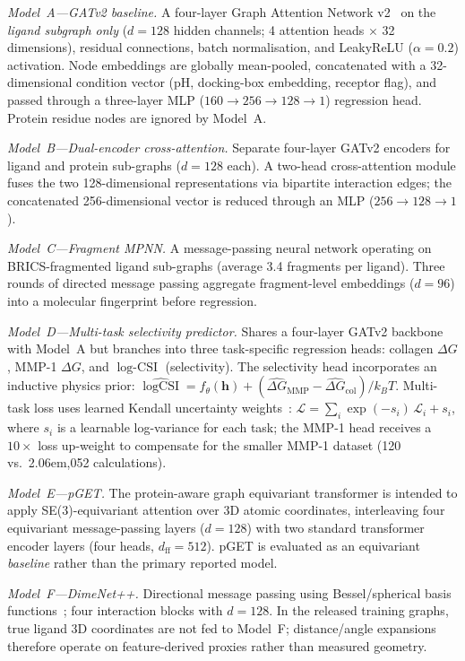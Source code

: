 \documentclass[11pt]{article}
\begin{document}
\emph{Model~A---GATv2 baseline.}
A four-layer Graph Attention Network v2~\cite{gilmer2017mpnn} on the
\emph{ligand subgraph only} ($d = 128$ hidden channels; 4 attention heads
$\times$ 32 dimensions), residual connections, batch normalisation, and
LeakyReLU ($\alpha = 0.2$) activation.  Node embeddings are globally
mean-pooled, concatenated with a 32-dimensional condition vector (pH,
docking-box embedding, receptor flag), and passed through a three-layer MLP
($160 \to 256 \to 128 \to 1$) regression head.
Protein residue nodes are ignored by Model~A.

\emph{Model~B---Dual-encoder cross-attention.}
Separate four-layer GATv2 encoders for ligand and protein sub-graphs
($d = 128$ each).  A two-head cross-attention module fuses the
two 128-dimensional representations via bipartite interaction edges;
the concatenated 256-dimensional vector is reduced through an MLP
($256 \to 128 \to 1$).

\emph{Model~C---Fragment MPNN.}
A message-passing neural network operating on BRICS-fragmented ligand
sub-graphs (average 3.4 fragments per ligand).  Three rounds of directed
message passing aggregate fragment-level embeddings ($d = 96$) into a
molecular fingerprint before regression.

\emph{Model~D---Multi-task selectivity predictor.}
Shares a four-layer GATv2 backbone with Model~A but branches into three
task-specific regression heads: collagen $\Delta G$, MMP-1 $\Delta G$,
and $\log\text{-CSI}$ (selectivity).  The selectivity head
incorporates an inductive physics prior:
$\widehat{\log\text{CSI}} = f_{\theta}(\mathbf{h}) +
(\hat{\Delta G}_{\text{MMP}} - \hat{\Delta G}_{\text{col}}) / k_{B}T$.
Multi-task loss uses learned Kendall uncertainty
weights~\cite{kendall2018multi}:
$\mathcal{L} = \sum_{i} \exp(-s_{i})\,\mathcal{L}_{i} + s_{i}$,
where $s_{i}$ is a learnable log-variance for each task;
the MMP-1 head receives a $10\times$ loss up-weight to compensate
for the smaller MMP-1 dataset (120 vs.\ 2\kern .06em,052 calculations).

\emph{Model~E---pGET.}
The protein-aware graph equivariant transformer is intended to apply
\textsf{SE(3)}-equivariant attention over 3D atomic coordinates,
interleaving four equivariant message-passing layers ($d = 128$) with
two standard transformer encoder layers (four heads, $d_{\text{ff}} = 512$).
pGET is evaluated as an equivariant \emph{baseline} rather than the primary
reported model.

\emph{Model~F---DimeNet++.}
Directional message passing using Bessel/spherical basis
functions~\cite{schutt2018schnet}; four interaction blocks with
$d = 128$.
In the released training graphs, true ligand 3D coordinates are not
fed to Model~F; distance/angle expansions therefore operate on
feature-derived proxies rather than measured geometry.
\end{document}
